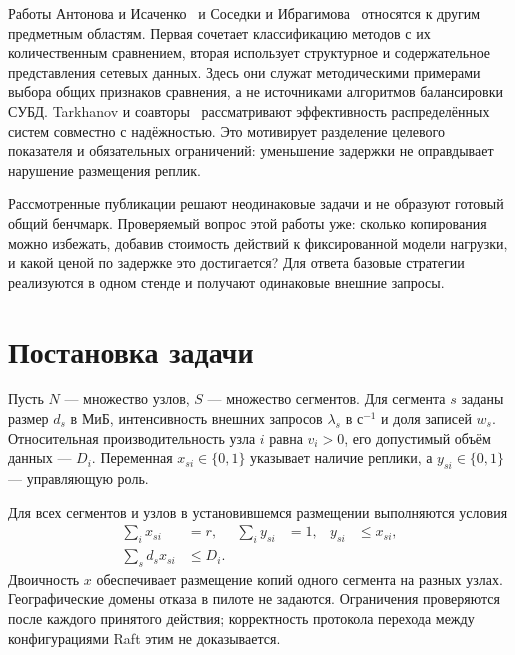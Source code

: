 \documentclass{misisarticle}
\begin{document}
Работы Антонова и Исаченко~\cite{antonov2023} и Соседки и Ибрагимова~\cite{sosedka2024} относятся к другим предметным областям. Первая сочетает классификацию методов с их количественным сравнением, вторая использует структурное и содержательное представления сетевых данных. Здесь они служат методическими примерами выбора общих признаков сравнения, а не источниками алгоритмов балансировки СУБД. Tarkhanov и соавторы~\cite{tarkhanov2020} рассматривают эффективность распределённых систем совместно с надёжностью. Это мотивирует разделение целевого показателя и обязательных ограничений: уменьшение задержки не оправдывает нарушение размещения реплик.

Рассмотренные публикации решают неодинаковые задачи и не образуют готовый общий бенчмарк. Проверяемый вопрос этой работы уже: сколько копирования можно избежать, добавив стоимость действий к фиксированной модели нагрузки, и какой ценой по задержке это достигается? Для ответа базовые стратегии реализуются в одном стенде и получают одинаковые внешние запросы.

\section{Постановка задачи}
Пусть $N$ --- множество узлов, $S$ --- множество сегментов. Для сегмента $s$ заданы размер $d_s$ в МиБ, интенсивность внешних запросов $\lambda_s$ в с$^{-1}$ и доля записей $w_s$. Относительная производительность узла $i$ равна $v_i>0$, его допустимый объём данных --- $D_i$. Переменная $x_{si}\in\{0,1\}$ указывает наличие реплики, а $y_{si}\in\{0,1\}$ --- управляющую роль.

Для всех сегментов и узлов в установившемся размещении выполняются условия
\begin{align}
\sum_i x_{si}&=r, & \sum_i y_{si}&=1, & y_{si}&\le x_{si}, \label{eq:placement}\\
\sum_s d_s x_{si}&\le D_i. &&&&\label{eq:storage}
\end{align}
Двоичность $x$ обеспечивает размещение копий одного сегмента на разных узлах. Географические домены отказа в пилоте не задаются. Ограничения проверяются после каждого принятого действия; корректность протокола перехода между конфигурациями Raft этим не доказывается.
\end{document}
